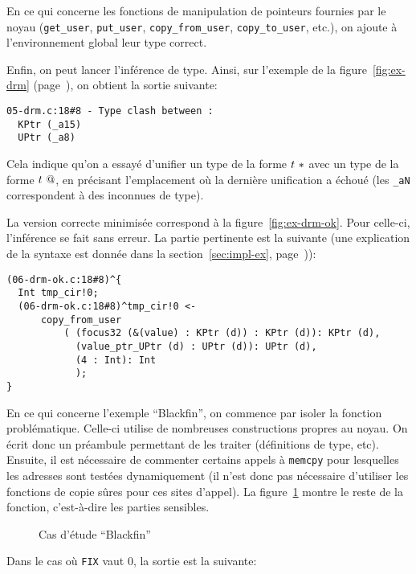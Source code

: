 En ce qui concerne les fonctions de manipulation de pointeurs fournies
par le noyau (\texttt{get\_user}, \texttt{put\_user},
\texttt{copy\_from\_user}, \texttt{copy\_to\_user}, etc.), on ajoute à
l'environnement global leur type correct.

Enfin, on peut lancer l'inférence de type. Ainsi, sur l'exemple de la
figure~\ref{fig:ex-drm} (page~\pageref{fig:ex-drm}), on obtient la sortie
suivante:

\begin{Verbatim}
05-drm.c:18#8 - Type clash between :
  KPtr (_a15)
  UPtr (_a8)
\end{Verbatim}

Cela indique qu'on a essayé d'unifier un type de la forme $t~*$ avec un
type de la forme $t~@$, en précisant l'emplacement où la dernière
unification a échoué (les \texttt{\_aN} correspondent à des inconnues de type).

La version correcte minimisée correspond à la figure~\ref{fig:ex-drm-ok}. Pour
celle-ci, l'inférence se fait sans erreur. La partie pertinente est la suivante
(une explication de la syntaxe est donnée dans la section~\ref{sec:impl-ex},
page~\pageref{sec:impl-ex})):

\begin{Verbatim}
(06-drm-ok.c:18#8)^{
  Int tmp_cir!0;
  (06-drm-ok.c:18#8)^tmp_cir!0 <-
      copy_from_user
          ( (focus32 (&(value) : KPtr (d)) : KPtr (d)): KPtr (d),
            (value_ptr_UPtr (d) : UPtr (d)): UPtr (d),
            (4 : Int): Int
            );
}
\end{Verbatim}

En ce qui concerne l'exemple \enquote{Blackfin}, on commence par isoler la
fonction problématique. Celle-ci utilise de nombreuses constructions propres au
noyau. On écrit donc un préambule permettant de les traiter (définitions de
type, etc). Ensuite, il est nécessaire de commenter certains appels à
\texttt{memcpy} pour lesquelles les adresses sont testées dynamiquement (il
n'est donc pas nécessaire d'utiliser les fonctions de copie sûres pour ces sites
d'appel). La figure~\ref{fig:blackfin-cas} montre le reste de la fonction,
c'est-à-dire les parties sensibles.

\begin{figure}
\caption{Cas d'étude \enquote{Blackfin}}
\label{fig:blackfin-cas}
\end{figure}

Dans le cas où \texttt{FIX} vaut 0, la sortie est la suivante:

